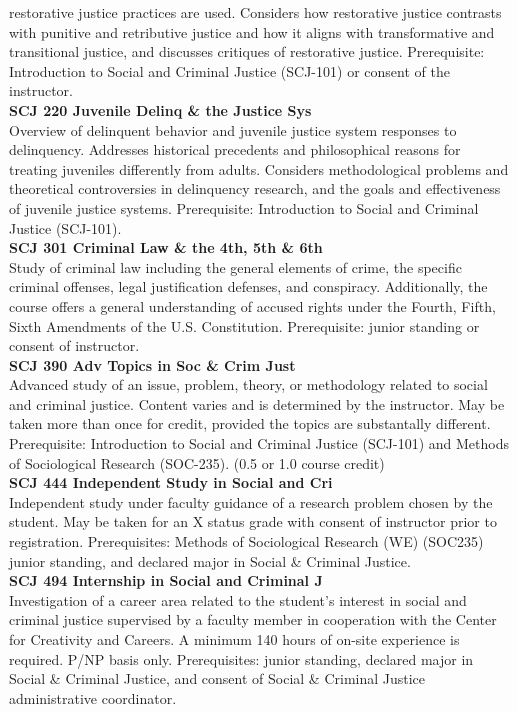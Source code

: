 \documentclass[
  letterpaper,
]{scrbook}
\begin{document}
restorative justice practices are used. Considers how restorative
justice contrasts with punitive and retributive justice and how it
aligns with transformative and transitional justice, and discusses
critiques of restorative justice. Prerequisite: Introduction to Social
and Criminal Justice (SCJ-101) or consent of the instructor.\\
\textbf{SCJ 220 Juvenile Delinq \& the Justice Sys}\\
Overview of delinquent behavior and juvenile justice system responses to
delinquency. Addresses historical precedents and philosophical reasons
for treating juveniles differently from adults. Considers methodological
problems and theoretical controversies in delinquency research, and the
goals and effectiveness of juvenile justice systems. Prerequisite:
Introduction to Social and Criminal Justice (SCJ-101).\\
\textbf{SCJ 301 Criminal Law \& the 4th, 5th \& 6th}\\
Study of criminal law including the general elements of crime, the
specific criminal offenses, legal justification defenses, and
conspiracy. Additionally, the course offers a general understanding of
accused rights under the Fourth, Fifth, Sixth Amendments of the U.S.
Constitution. Prerequisite: junior standing or consent of instructor.\\
\textbf{SCJ 390 Adv Topics in Soc \& Crim Just}\\
Advanced study of an issue, problem, theory, or methodology related to
social and criminal justice. Content varies and is determined by the
instructor. May be taken more than once for credit, provided the topics
are substantally different. Prerequisite: Introduction to Social and
Criminal Justice (SCJ-101) and Methods of Sociological Research
(SOC-235). (0.5 or 1.0 course credit)\\
\textbf{SCJ 444 Independent Study in Social and Cri}\\
Independent study under faculty guidance of a research problem chosen by
the student. May be taken for an X status grade with consent of
instructor prior to registration. Prerequisites: Methods of Sociological
Research (WE) (SOC235) junior standing, and declared major in Social \&
Criminal Justice.\\
\textbf{SCJ 494 Internship in Social and Criminal J}\\
Investigation of a career area related to the student's interest in
social and criminal justice supervised by a faculty member in
cooperation with the Center for Creativity and Careers. A minimum 140
hours of on-site experience is required. P/NP basis only. Prerequisites:
junior standing, declared major in Social \& Criminal Justice, and
consent of Social \& Criminal Justice administrative coordinator.
\end{document}
